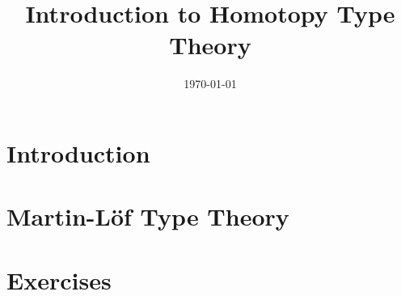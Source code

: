 \documentclass{amsart}
\title{Introduction to Homotopy Type Theory}
\author{}
\date{\today}
\begin{document}
\maketitle
\tableofcontents

\section{Introduction}
\label{sec:introduction}

\section{Martin-L\"{o}f Type Theory}
\label{sec:martin-lof-type-theory}

\section{Exercises}
\label{sec:exercises}



\end{document}
